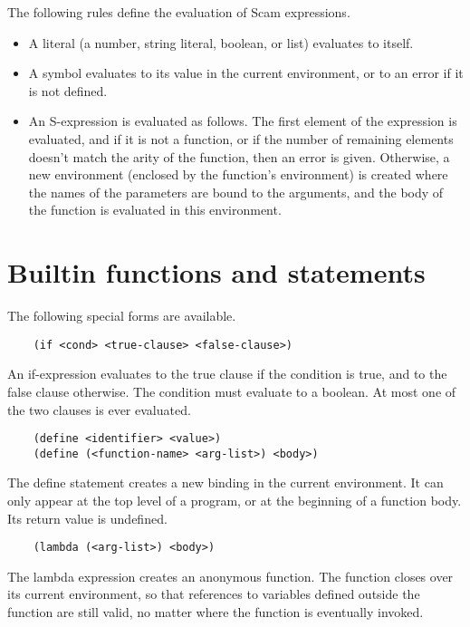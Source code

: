 \documentclass{article}
\begin{document}
The following rules define the evaluation of Scam expressions.

\begin{itemize}
\item{A literal (a number, string literal, boolean, or list) evaluates to itself.}
\item{A symbol evaluates to its value in the current environment, or to an error if it is not defined.}
\item{An S-expression is evaluated as follows. The first element of the expression is evaluated, and if it is not a function, or if the number of remaining elements doesn't match the arity of the function, then an error is given. Otherwise, a new environment (enclosed by the function's environment) is created where the names of the parameters are bound to the arguments, and the body of the function is evaluated in this environment.}
\end{itemize}

\section{Builtin functions and statements}
The following special forms are available.

\begin{verbatim}
    (if <cond> <true-clause> <false-clause>)
\end{verbatim}

An if-expression evaluates to the true clause if the condition is true, and to the false clause otherwise. The condition must evaluate to a boolean. At most one of the two clauses is ever evaluated.

\begin{verbatim}
    (define <identifier> <value>)
    (define (<function-name> <arg-list>) <body>)
\end{verbatim}

The define statement creates a new binding in the current environment. It can only appear at the top level of a program, or at the beginning of a function body. Its return value is undefined.

\begin{verbatim}
    (lambda (<arg-list>) <body>)
\end{verbatim}

The lambda expression creates an anonymous function. The function closes over its current environment, so that references to variables defined outside the function are still valid, no matter where the function is eventually invoked.
\end{document}
